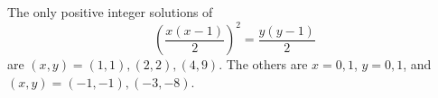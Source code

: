 \begin{proposition}
    The only positive integer solutions of
\[
    \left(\frac{x(x-1)}{2}\right)^2=\frac{y(y-1)}{2}
\]
    are $(x,y)=(1,1),(2,2),(4,9)$. The others are $x=0,1$, $y=0,1$, and $(x,y)=(-1,-1),(-3,-8)$.
\end{proposition}
